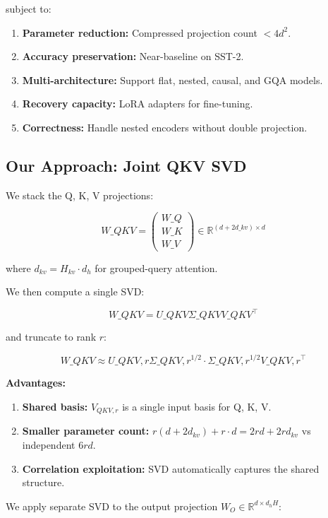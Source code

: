 subject to:

\begin{enumerate}
\item \textbf{Parameter reduction:} Compressed projection count $< 4 d^2$.
\item \textbf{Accuracy preservation:} Near-baseline on SST-2.
\item \textbf{Multi-architecture:} Support flat, nested, causal, and GQA models.
\item \textbf{Recovery capacity:} LoRA adapters for fine-tuning.
\item \textbf{Correctness:} Handle nested encoders without double projection.

\end{enumerate}
\subsection{Our Approach: Joint QKV SVD}

We stack the Q, K, V projections:

\[
W\_{QKV} = \begin{pmatrix} W\_Q \\ W\_K \\ W\_V \end{pmatrix} \in \mathbb{R}^{(d + 2 d\_{kv}) \times d}
\]

where $d_{kv} = H_{kv} \cdot d_h$ for grouped-query attention.

We then compute a single SVD:

\[
W\_{QKV} = U\_{QKV} \Sigma\_{QKV} V\_{QKV}^\top
\]

and truncate to rank $r$:

\[
W\_{QKV} \approx U\_{QKV, r} \Sigma\_{QKV, r}^{1/2} \cdot \Sigma\_{QKV, r}^{1/2} V\_{QKV, r}^\top
\]

\textbf{Advantages:}

\begin{enumerate}
\item \textbf{Shared basis:} $V_{QKV, r}$ is a single input basis for Q, K, V.
\item \textbf{Smaller parameter count:} $r(d + 2d_{kv}) + r \cdot d = 2rd + 2r d_{kv}$ vs
  independent $6rd$.
\item \textbf{Correlation exploitation:} SVD automatically captures the shared
  structure.

\end{enumerate}
We apply separate SVD to the output projection $W_O \in \mathbb{R}^{d \times d_h H}$:

